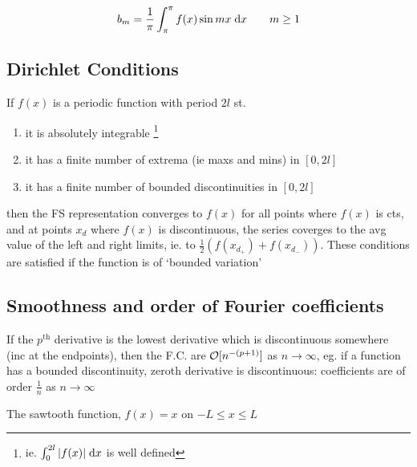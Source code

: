 \documentclass[a4paper]{article}
\begin{document}
\[ b_{m} = \frac{1}{\pi} \int_{\pi}^{\pi} f(x) \sin m x \; \mathrm{d} x \qquad m \geq 1 \]


\subsection{Dirichlet Conditions}

If $ f(x) $ is a periodic function with period $ 2l $ st.

\begin{enumerate}
	\item it is absolutely integrable \footnote{ie. $ \int_{0}^{2l} | f(x) | \; \mathrm{d} x $ is well defined}
	\item it has a finite number of extrema (ie maxs and mins) in $ [0,2l] $
	\item it has a finite number of bounded discontinuities in $ [0,2l] $
	
\end{enumerate}

then the FS representation converges to $ f(x) $ for all points where $ f(x) $ is cts, and at points $ x_{d} $ where $ f(x) $ is discontinuous, the series coverges to the avg value of the left and right limits, ie. to $ \frac{1}{2} \left( f(x_{d_{+}}) + f(x_{d_{-}}) \right)  $. These conditions are satisfied if the function is of `bounded variation'

\subsection{Smoothness and order of Fourier coefficients}

If the $ p^{\text{th}} $ derivative is the lowest derivative which is discontinuous somewhere (inc at the endpoints), then the F.C. are $ \mathcal{O}[n^{-(p+1)}] $ as $ n \to \infty $, eg. if a function has a bounded discontinuity, zeroth derivative is discontinuous: coefficients are of order $ \frac{1}{n} $ as $ n \to \infty $

\begin{eg}
	The sawtooth function, $ f(x) = x $ on $ -L \leq x \leq L $
	
	  \begin{center}
	\end{center}
\end{eg}
\end{document}
